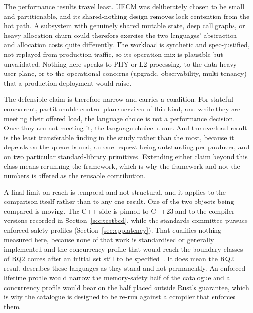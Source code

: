 \documentclass[english,oneside,a4paper,censored,csm,software-track-2020]{HYthesisML}
\begin{document}
The performance
results travel least. UECM was deliberately chosen to be small and
partitionable, and its shared-nothing design removes lock contention from the hot path. A
subsystem with genuinely shared mutable state, deep call graphs, or heavy allocation churn could
therefore exercise the two languages' abstraction and allocation costs quite differently. The
workload is synthetic and spec-justified, not replayed from production traffic, so its operation
mix is plausible but unvalidated. Nothing here speaks to PHY or L2 processing, to the data-heavy
user plane, or to the operational concerns (upgrade, observability, multi-tenancy) that a
production deployment would raise.

The defensible claim is therefore narrow and carries a condition. For
stateful, concurrent, partitionable control-plane services of this kind, and while they are
meeting their offered load, the language choice is not a performance decision. Once they are not
meeting it, the language choice is one. And the overload result is the least transferable finding
in the study rather than the most, because it depends on the queue bound, on one request being
outstanding per producer, and on two particular standard-library primitives. Extending either
claim beyond this class means rerunning the framework, which is why the framework and not the
numbers is offered as the reusable contribution.

A final limit on reach is temporal and not structural, and it applies to the comparison
itself rather than to any one result. One of the two objects being compared is moving. The C++
side is pinned to C++23 and to the compiler versions recorded in
Section~\ref{sec:testbed}, while the standards committee pursues enforced safety
profiles (Section~\ref{sec:cpplatency}). That qualifies nothing measured here, because
none of that work is standardised or generally implemented and the concurrency profile that
would reach the boundary classes of RQ2 comes after an initial set still to be
specified~\cite{vandevoorde2026profiles}. It does mean the RQ2 result describes these languages
as they stand and not permanently. An enforced lifetime profile would narrow the memory-safety
half of the catalogue and a concurrency profile would bear on the half placed outside Rust's
guarantee, which is why the catalogue is designed to be re-run against a compiler that enforces
them.
\end{document}
